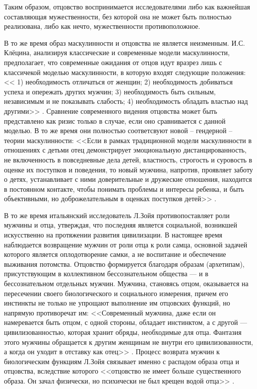 \documentclass{../../common/thesisbyxetex}
\begin{document}
Таким образом, отцовство воспринимается исследователями либо как важнейшая составляющая
мужественности, без которой она не может быть полностью реализована, либо как нечто, мужественности
противоположное.

В то же время образ маскулинности и отцовства не является неизменным. И.С. Клёцина, анализируя
классические и современные модели маскулинности, предполагает, что современные ожидания от отцов
идут вразрез лишь с классичекой моделью маскулинности, в которую входят следующие положения:
<< 1) необходимость отличаться от женщин; 2)
необходимость добиваться успеха и опережать других мужчин; 3) необходимость быть сильным,
независимым и не показывать слабость; 4) необходимость обладать властью над другими>> \cite{clec}.
Сравнение современного видения отцовства может быть представлено как ризис только в случае, если
оно сравнивается с данной моделью.
В то же время они полностью соответсвуют новой -- гендерной -- теории маскулинности: <<Если в рамках
традиционной модели маскулинности в отношениях с детьми отец демонстрирует эмоциональную
дистанцированность, не включенность в повседневные дела детей, властность, строгость и суровость в
оценке их поступков и поведения, то новый мужчина, напротив, проявляет заботу о детях, устанавливает
с ними доверительные и дружеские отношения, находится в постоянном контакте, чтобы понимать проблемы
и интересы ребенка, и быть объективными, но доброжелательным в оценках поступков детей>>
\cite{clec}.

В то же время итальянский исследователь Л.Зойя противопоставляет роли
мужчины и отца, утверждая, что последняя является социальной,
возникшей искусственно на протяжении развития цивилизации. В настоящее время наблюдается
возвращение мужчин от роли отца к роли самца, основной задачей которого является оплодотворение
самки, а не воспитание и обеспечение выживания потомства. Отцовство формируется благодаря
образам (архетипам), присутствующим в коллективном бессознательном общества --- и в
бессознательном отдельных мужчин. Мужчина, становясь отцом, оказывается на пересечении
своего биологического и социального измерения, причем его инстинкты не только не упрощают
выполнение им отцовских функций, но напрямую противоречат им: <<Современный мужчина, даже
если он намеревается быть отцом, с одной стороны, обладает инстинктом, а с другой ---
цивилизованностью, которая хранит обряды, необходимые для отца. Фантазия этого мужчины
обращается к другим женщинам не внутри его цивилизованности, а когда он уходит в отставку
как отец>> \cite[270]{zo}. Процесс возврата мужчин к биологическим функциям Л.Зойя связывает
именно с распадом образа отца и отцовства, вследствие которого <<отцовство не имеет больше
существенного образа. Он зачал физически, но психически не был крещен водой отца>> \cite[270]{zo}.
\end{document}
